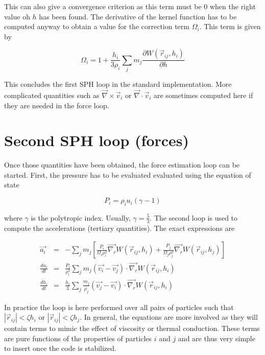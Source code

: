 \documentclass[a4paper,10pt]{article}
\begin{document}
This can also give a convergence criterion as this term must be $0$ when the right value oh $h$ has been found.
The derivative of the kernel function has to be computed anyway to obtain a value for the correction term $\Omega_i$.
This term is given by

\begin{equation}
  \Omega_i = 1 + \frac{h_i}{3\rho_i}\sum_j m_j\frac{\partial W(\vec{r}_{ij},h_i)}{\partial h}
\end{equation}

This concludes the first SPH loop in the standard implementation. More complicated quantities such as
$\vec\nabla\times\vec v_i$ or $\vec\nabla\cdot\vec v_i$ are sometimes computed here if they are needed in the force
loop.

\section{Second SPH loop (forces)}

Once those quantities have been obtained, the force estimation loop can be started.
First, the pressure has to be evaluated evaluated using the equation of state

\begin{equation}
 P_i = \rho_i u_i (\gamma - 1)
\end{equation}

where $\gamma$ is the polytropic index. Usually, $\gamma = \frac{5}{3}$.
The second loop is used to compute the accelerations (tertiary quantities). The exact expressions are

\begin{eqnarray}
 \vec{a_i} &=& - \sum_j m_j\left[\frac{P_i}{\Omega_i\rho_i^2}\vec{\nabla_r} W(\vec{r}_{ij}, h_i) +
\frac{P_j}{\Omega_j\rho_j^2}\vec{\nabla_r}W(\vec{r}_{ij}, h_j) \right] \label{eq:acceleration}\\
 \frac{du_i}{dt} &=& \frac{P_i}{\rho_i^2} \sum_j m_j (\vec{v_i}-\vec{v_j})\cdot\vec{\nabla_r} W(\vec{r}_{ij}, h_i)
\label{eq:dudt}\\
 \frac{dh_i}{dt} &=& \frac{h_i}{3}\sum_j \frac{m_j}{\rho_j} \left(\vec{v_j} - \vec{v_i} \right)
\cdot\vec{\nabla_r}W(\vec{r}_{ij},
h_i)
\end{eqnarray}

In practice the loop is here performed over all pairs of particles such that $|\vec{r}_{ij}| < \zeta h_i$ or
$|\vec{r}_{ij}| < \zeta
h_j$. In general, the equations are more involved as they will contain terms to mimic the effect of viscosity or
thermal conduction. These terms are pure functions of the properties of particles $i$ and $j$ and are thus very simple
to insert once the code is stabilized.\\
\end{document}
